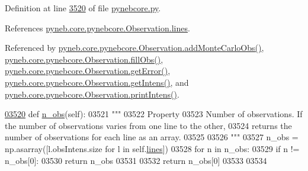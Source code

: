 Definition at line \hyperlink{pynebcore_8py_source_l03520}{3520} of file \hyperlink{pynebcore_8py_source}{pynebcore.\+py}.



References \hyperlink{pynebcore_8py_source_l03420}{pyneb.\+core.\+pynebcore.\+Observation.\+lines}.



Referenced by \hyperlink{pynebcore_8py_source_l03947}{pyneb.\+core.\+pynebcore.\+Observation.\+add\+Monte\+Carlo\+Obs()}, \hyperlink{pynebcore_8py_source_l03452}{pyneb.\+core.\+pynebcore.\+Observation.\+fill\+Obs()}, \hyperlink{pynebcore_8py_source_l03809}{pyneb.\+core.\+pynebcore.\+Observation.\+get\+Error()}, \hyperlink{pynebcore_8py_source_l03782}{pyneb.\+core.\+pynebcore.\+Observation.\+get\+Intens()}, and \hyperlink{pynebcore_8py_source_l03836}{pyneb.\+core.\+pynebcore.\+Observation.\+print\+Intens()}.


\begin{DoxyCode}
\hypertarget{classpyneb_1_1core_1_1pynebcore_1_1_observation_l03520}{}\hyperlink{classpyneb_1_1core_1_1pynebcore_1_1_observation_aef2877f7f50f5c70cee1f0da97b34081}{03520}     \textcolor{keyword}{def }\hyperlink{classpyneb_1_1core_1_1pynebcore_1_1_observation_aef2877f7f50f5c70cee1f0da97b34081}{n\_obs}(self):
03521         \textcolor{stringliteral}{"""}
03522 \textcolor{stringliteral}{        Property}
03523 \textcolor{stringliteral}{        Number of observations. If the number of observations varies from one line to the other,}
03524 \textcolor{stringliteral}{            returns the number of observations for each line as an array.}
03525 \textcolor{stringliteral}{            }
03526 \textcolor{stringliteral}{        """}
03527         n\_obs = np.asarray([l.obsIntens.size \textcolor{keywordflow}{for} l \textcolor{keywordflow}{in} self.\hyperlink{classpyneb_1_1core_1_1pynebcore_1_1_observation_a78332043ca9f290590edf6b8a1e5b767}{lines}])
03528         \textcolor{keywordflow}{for} n \textcolor{keywordflow}{in} n\_obs:
03529             \textcolor{keywordflow}{if} n != n\_obs[0]:
03530                 \textcolor{keywordflow}{return} n\_obs
03531                 
03532         \textcolor{keywordflow}{return} n\_obs[0]
03533     
03534     
\end{DoxyCode}
\hypertarget{classpyneb_1_1core_1_1pynebcore_1_1_observation_ab9a38256db6dda5f5c3a9d1a7cd06d8f}{}
